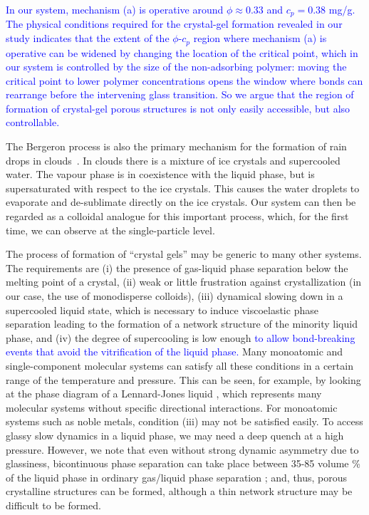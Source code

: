 \documentclass[preprint,amsmath,amssymb,superscriptaddress]{revtex4-1}
\begin{document}
\textcolor{blue}{In our system, mechanism (a) is operative around $\phi\approx 0.33$ and $c_p=0.38$ mg/g. 
The physical conditions required for the crystal-gel formation revealed in our study indicates that the extent of the $\phi$-$c_p$ region where mechanism (a) is operative can be widened by changing the location of the critical point, which in our system is controlled by the size of the non-adsorbing polymer: moving the critical point to lower polymer concentrations opens the window where bonds can rearrange before the intervening glass transition. So we argue that the region of formation of crystal-gel porous structures is not only easily accessible, but also controllable.}


The Bergeron process is also the primary mechanism for the formation of rain drops in clouds~\cite{glickman2000glossary,morrison2012resilience}.
In clouds there is a mixture of ice crystals and supercooled water. The vapour phase is in coexistence with the liquid phase, but is supersaturated
with respect to the ice crystals. This causes the water droplets to evaporate and de-sublimate directly on the ice crystals. Our system can then
be regarded as a colloidal analogue for this important process, which, for the first time, we can observe at the single-particle level.  

The process of formation of ``crystal gels'' may be generic to many other 
systems. The requirements are (i) the presence of gas-liquid phase separation below the melting point of a crystal, (ii) 
weak or little frustration against crystallization (in our case, the use of monodisperse colloids), 
(iii) dynamical slowing down in a supercooled liquid state, which is necessary to induce viscoelastic phase separation leading to the formation 
of a network structure of the minority liquid phase, and (iv) the degree of supercooling is low enough
\textcolor{blue}{to allow bond-breaking events that avoid the vitrification of the liquid phase.}
Many monoatomic and single-component molecular systems can satisfy all these conditions in a certain range of the temperature and pressure. 
This can be seen, for example, by looking at the phase diagram of a Lennard-Jones liquid \cite{lodge1997brownian}, which represents many molecular systems 
without specific directional interactions. For monoatomic systems such as noble metals, condition (iii) may not be satisfied easily. 
To access glassy slow dynamics in a liquid phase, we may need a deep quench at a high pressure. However, we note that even without strong dynamic asymmetry 
due to glassiness, bicontinuous phase separation can take place between 35-85 volume \% of the liquid phase in ordinary gas/liquid phase separation \cite{Onuki2002}; 
and, thus, porous crystalline structures can be formed, although a thin network structure may be difficult to be formed.
\end{document}
